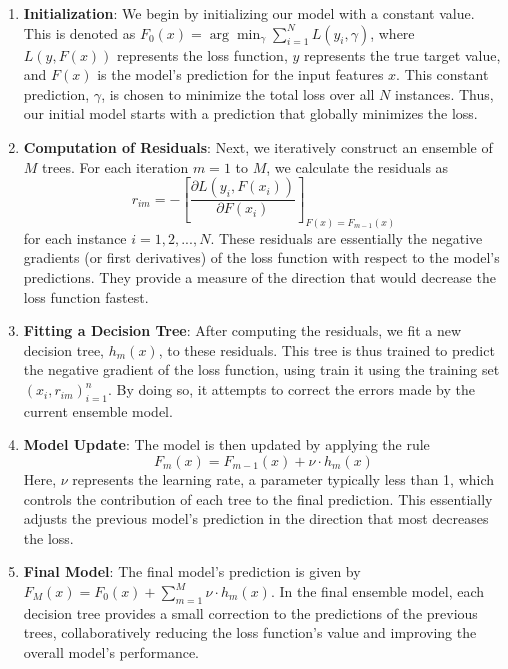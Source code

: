 \begin{enumerate}
	\item \textbf{Initialization}: We begin by initializing our model with a constant value. This is denoted as $F_0(x) = \arg\min_{\gamma} \sum_{i=1}^{N} L(y_i, \gamma)$, where $L(y, F(x))$ represents the loss function, $y$ represents the true target value, and $F(x)$ is the model's prediction for the input features $x$. This constant prediction, $\gamma$, is chosen to minimize the total loss over all $N$ instances. Thus, our initial model starts with a prediction that globally minimizes the loss.
	\item \textbf{Computation of Residuals}: Next, we iteratively construct an ensemble of $M$ trees. For each iteration $m=1$ to $M$, we calculate the residuals as
	\begin{equation}
		r_{im} = - \left[\frac{\partial L(y_i, F(x_i))}{\partial F(x_i)}\right]_{F(x)=F_{m-1}(x)}
	\end{equation} 
 	for each instance $i=1,2,...,N$. These residuals are essentially the negative gradients (or first derivatives) of the loss function with respect to the model's predictions. They provide a measure of the direction that would decrease the loss function fastest.
	\item \textbf{Fitting a Decision Tree}: After computing the residuals, we fit a new decision tree, $h_m(x)$, to these residuals. This tree is thus trained to predict the negative gradient of the loss function, using train it using the training set 
	${(x_i, r_{im})}_{i=1}^n$. By doing so, it attempts to correct the errors made by the current ensemble model.
	\item \textbf{Model Update}: The model is then updated by applying the rule
	\begin{equation}
		F_m(x) = F_{m-1}(x) + \nu \cdot h_m(x)
	\end{equation}
 	Here, $\nu$ represents the learning rate, a parameter typically less than 1, which controls the contribution of each tree to the final prediction. This essentially adjusts the previous model's prediction in the direction that most decreases the loss.
	\item \textbf{Final Model}: The final model's prediction is given by $F_M(x) = F_0(x) + \sum_{m=1}^{M} \nu \cdot h_m(x)$. In the final ensemble model, each decision tree provides a small correction to the predictions of the previous trees, collaboratively reducing the loss function's value and improving the overall model's performance.
\end{enumerate}


